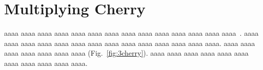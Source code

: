 \documentclass[twocolumn,9pt]{article}
\begin{document}
\setlength{\baselineskip}{1.1zw}
%
%
%
\section{Multiplying Cherry}
%
%
%
aaaa aaaa aaaa aaaa aaaa aaaa aaaa
aaaa aaaa aaaa aaaa aaaa aaaa aaaa~\cite{orange}.
aaaa aaaa aaaa aaaa aaaa aaaa aaaa
aaaa aaaa aaaa aaaa aaaa aaaa aaaa.
aaaa aaaa aaaa aaaa aaaa aaaa aaaa (Fig.~\ref{fig:3cherry}).
aaaa aaaa aaaa aaaa aaaa aaaa aaaa
aaaa aaaa aaaa aaaa.

%
%
%
\end{document}
